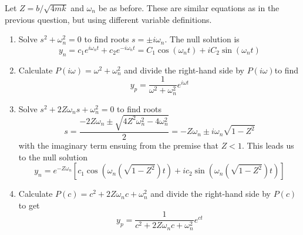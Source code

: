 \documentclass[a4paper]{article}
\begin{document}
Let \( Z = b / \sqrt{4mk} \) and \( \omega_{n } \) be as before. These are similar equations as in the previous question, but using different variable definitions.

\begin{enumerate}[label=(\alph*)]
	\item Solve \( s^{2} + \omega^{2}_{n } = 0 \) to find roots \( s = \pm i \omega_{n } \). The null solution is
	\[
		y_{n } = c_{1} e^{i \omega_{n } t } + c_{2} e^{-i \omega_{n } t} = C_{1} \cos\!\left( \omega_{n } t \right) + i C_{2} \sin\!\left( \omega_{n } t \right)  
	\]
	\item Calculate \( P \!\left( i \omega \right) = \omega^{2} + \omega^{2}_{n } \) and divide the right-hand side by \( P \!\left( i \omega \right) \)to find
	\[
		y_{p } = \frac{1}{\omega^{2} + \omega^{2}_{n }} e^{i \omega t} 
	\]
	\item Solve \( s^{2} + 2Z \omega_{n } s + \omega^{2}_{n } = 0 \) to find roots
	\[
		s = \frac{-2Z \omega_{n } \pm \sqrt{4 Z^{2} \omega^{2}_{n } - 4 \omega^{2}_{n }}}{2} = -Z \omega_{n } \pm i \omega_{n } \sqrt{1 - Z^{2}}
	\]
	with the imaginary term ensuing from the premise that \( Z < 1 \). This leads us to the null solution
	\[
		y_{n } = e^{-Z \omega_{n}} \!\left[ c_{1} \cos\!\left( \omega_{n } \!\left( \sqrt{1 - Z^{2}} \right) t \right) + ic_{2} \sin\!\left( \omega_{n } \!\left( \sqrt{1 - Z^{2}} \right) t \right)  \right] 
	\]
	\item Calculate \( P \!\left( c  \right) = c^{2} + 2 Z \omega_{n } c + \omega^{2}_{n } \) and divide the right-hand side by \( P \!\left( c  \right) \) to get
	\[
		y_{p } = \frac{1}{c^{2} + 2 Z \omega_{n } c + \omega^{2}_{n }} e^{ct} 
	\]
\end{enumerate}

\end{document}

